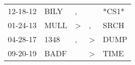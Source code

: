 \begin{supertabular}{p{0.07\textwidth}p{0.06\textwidth}p{0.02\textwidth}p{0.02\textwidth}p{0.06\textwidth}}
 12-18-12\textsuperscript{} &  BILY\textsuperscript{} &             , &               &                   *CS1* \\
 01-24-13\textsuperscript{} &  MULL\textsuperscript{} &  \textgreater &             , &  SRCH\textsuperscript{} \\
 04-28-17\textsuperscript{} &  1348\textsuperscript{} &             , &  \textgreater &  DUMP\textsuperscript{} \\
 09-20-19\textsuperscript{} &  BADF\textsuperscript{} &               &  \textgreater &  TIME\textsuperscript{} \\
\end{supertabular}
